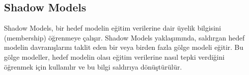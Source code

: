 \newpage

\subsection{Shadow Models}

Shadow Models, bir hedef modelin eğitim verilerine dair üyelik bilgisini (membership) öğrenmeye çalışır. Shadow Models yaklaşımında, saldırgan hedef modelin davranışlarını taklit eden bir veya birden fazla gölge modeli eğitir. Bu gölge modeller, hedef modelin olası eğitim verilerine nasıl tepki verdiğini öğrenmek için kullanılır ve bu bilgi saldırıya dönüştürülür.

\newpage